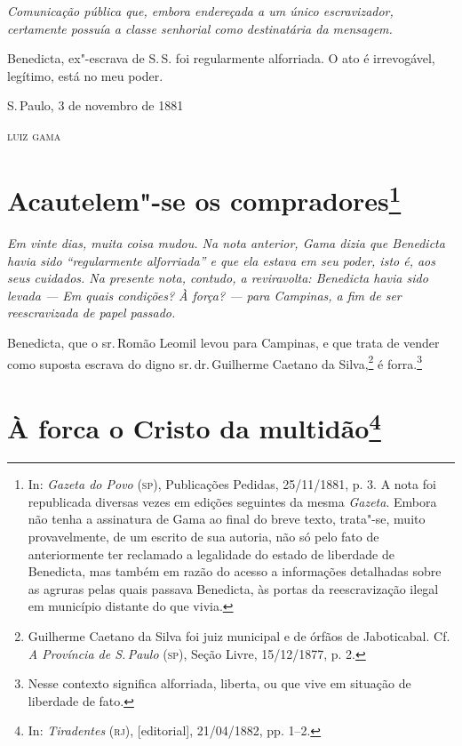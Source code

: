 \begin{flushleft}
{\footnotesize\itshape
Comunicação pública que, embora endereçada a um único
escravizador, certamente possuía a classe senhorial como destinatária da
mensagem.}
\end{flushleft}

\noindent{}Benedicta, ex"-escrava de S.\,S. foi regularmente alforriada. O ato é
irrevogável, legítimo, está no meu poder.

\bigskip

\hfill S.\,Paulo, 3 de novembro de 1881\smallskip

\hfill\textsc{luiz gama}


\chapter{Acautelem"-se os compradores\footnote[*]{In: \emph{Gazeta do Povo} (\textsc{sp}), Publicações
  Pedidas, 25/11/1881, p. 3. A nota foi republicada diversas vezes em
  edições seguintes da mesma \emph{Gazeta}. Embora não tenha a
  assinatura de Gama ao final do breve texto, trata"-se, muito
  provavelmente, de um escrito de sua autoria, não só pelo fato de
  anteriormente ter reclamado a legalidade do estado de liberdade de
  Benedicta, mas também em razão do acesso a informações detalhadas
  sobre as agruras pelas quais passava Benedicta, às portas da
  reescravização ilegal em município distante do que vivia.}}

\begin{flushleft}
{\footnotesize\itshape
Em vinte dias, muita coisa mudou. Na nota anterior, Gama dizia que
Benedicta havia sido ``regularmente alforriada'' e que ela estava em seu
poder, isto é, aos seus cuidados. Na presente nota, contudo, a
reviravolta: Benedicta havia sido levada --- Em quais condições? À força?
--- para Campinas, a fim de ser reescravizada de papel passado.}
\end{flushleft}

\noindent{}Benedicta, que o sr.\,Romão Leomil levou para Campinas, e que trata de
vender como suposta escrava do digno sr.\,dr.\,Guilherme Caetano da
Silva,\footnote{Guilherme Caetano da Silva foi juiz municipal e de
  órfãos de Jaboticabal. Cf. \emph{A Província de S.\,Paulo} (\textsc{sp}), Seção
  Livre, 15/12/1877, p. 2.} é forra.\footnote{Nesse contexto significa
  alforriada, liberta, ou que vive em situação de liberdade de fato.}

\chapter{À forca o Cristo da multidão\footnote[*]{In:
  \emph{Tiradentes} (\textsc{rj}), {[}editorial{]}, 21/04/1882, pp. 1--2.}}

